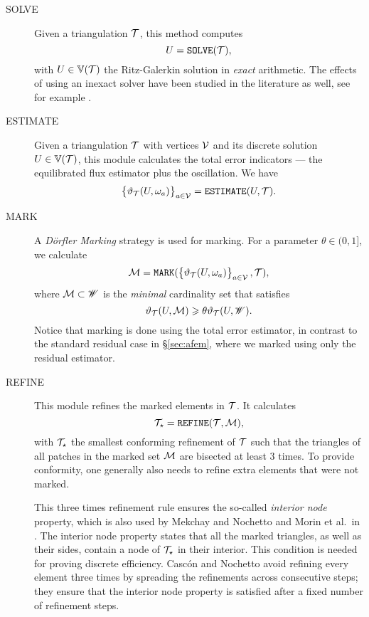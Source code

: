 \documentclass[thesis.tex]{subfiles}
\begin{document}
\begin{description}
  \item[SOLVE]
Given a triangulation $\mathcal{T}$, this method computes
\[
  U = \texttt{SOLVE}(\mathcal{T}),
\]
with $U \in \mathbb{V}(\mathcal{T})$ the  Ritz-Galerkin solution in \emph{exact} arithmetic. The effects of using an inexact solver have
been studied in the literature as well, see for example \cite{stevenson2007optimality}.
\item[ESTIMATE]
  Given a triangulation $\mathcal{T}$ with vertices $\mathcal{V}$ and its discrete solution $U \in \mathbb{V}(\mathcal{T})$, this module 
calculates the total error indicators --- the equilibrated flux estimator plus the oscillation. We have
\[
  \set{\vartheta_{\mathcal{T}}(U, \omega_a)}_{a \in \mathcal{V}} = \texttt{ESTIMATE}(U, \mathcal{T}).
\]
\item[MARK]
A \emph{D\"orfler Marking} strategy \cite{dorfler1996convergent} is used for marking. For a parameter $\theta \in (0,1]$, we calculate
\[
  \mathcal{M} = \texttt{MARK}( \set{\vartheta_{\mathcal{T}}(U, \omega_a)}_{a \in \mathcal{V}}, \mathcal{T}),
\]
where $\mathcal{M} \subset \mathscr{W}$ is the \emph{minimal} cardinality set that satisfies
\[
  \vartheta_{\mathcal{T}}(U,\mathcal{M}) \geqslant \theta \vartheta_{\mathcal{T}}(U, \mathscr{W}).
\]
Notice that marking is done using the total error estimator, in contrast to the standard residual case in \S\ref{sec:afem}, where we marked using only
the residual estimator.
\item[REFINE]
This module refines the marked elements in $\mathcal{T}$. It calculates
\[
  \mathcal{T}_\star = \texttt{REFINE}(\mathcal{T}, \mathcal{M}),
\]
with $\mathcal{T}_\star$ the smallest conforming refinement of $\mathcal{T}$ such that the triangles of
all patches in the marked set $\mathcal{M}$ are bisected at least 3 times. 
To provide conformity, one generally also needs to refine extra elements that were not marked.

This three times refinement rule ensures the so-called \emph{interior node} property,
which is also used by Mekchay and Nochetto \cite{mekchay2005convergence} and Morin et al.~in \cite{morin2002convergence}.
The interior node property states that all the marked triangles, as well as their sides, contain a node of $\mathcal{T}_\star$ in their interior.
This condition is needed for proving discrete efficiency. Casc\'on and Nochetto \cite{cascon2012} avoid
refining every element three times by  spreading the refinements across consecutive steps;
they ensure that the interior node property is satisfied after a fixed number of refinement steps.
\end{description}
\end{document}
